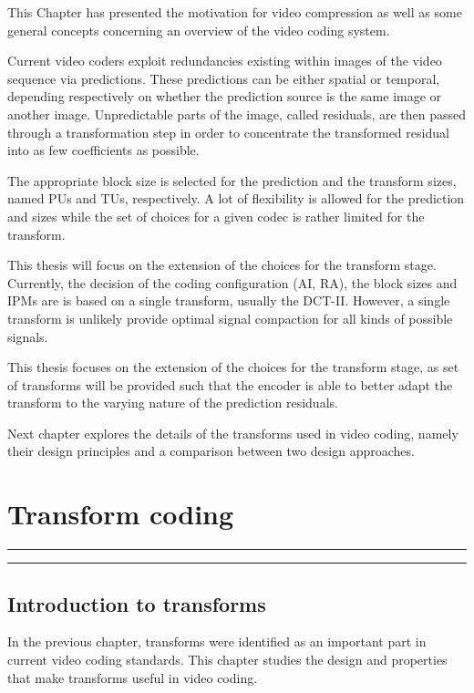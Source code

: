 \documentclass[11pt,a4paper,openright,twoside]{book}
\providecommand{\chaptertoc}{
	\startcontents[chapters]
	\hrule
	\vspace{1em}
	\printcontents[chapters]{}{1}{{\sf\large\bfseries Contents}}
	\vspace{1em}
	\hrule
}
\numberwithin{equation}{section} %
\numberwithin{figure}{section} %
\numberwithin{table}{section} %
\begin{document}
This Chapter has presented the motivation for video compression as well as
some general concepts concerning an overview of the video coding system.

Current video coders exploit redundancies existing within images of the video
sequence via predictions.
These predictions can be either spatial or temporal, depending respectively on
whether the prediction source is the same image or another image.
Unpredictable parts of the image, called residuals, are then passed through a
transformation step in order to concentrate the transformed residual into as
few coefficients as possible.

The appropriate block size is selected for the prediction and the transform
sizes, named \acp{PU} and \acp{TU}, respectively.
A lot of flexibility is allowed for the prediction and sizes while the set of
choices for a given codec is rather limited for the transform.

This thesis will focus on the extension of the choices for the transform
stage.
Currently, the decision of the coding configuration (\ac{AI}, \ac{RA}), the
block sizes and \acp{IPM} are is based on a single transform, usually the
\ac{DCT}-II.
However, a single transform is unlikely provide optimal signal compaction for
all kinds of possible signals.

This thesis focuses on the extension of the choices for the transform
stage, as set of transforms will be provided such that the encoder is able to
better adapt the transform to the varying nature of the prediction residuals.

Next chapter explores the details of the transforms used in video coding,
namely their design principles and a comparison between two design approaches.

\chapter{Transform coding}
\label{cha:transform_coding}
\chaptertoc

\section{Introduction to transforms}
\label{sec:introduction_to_transforms}

In the previous chapter, transforms were identified as an important part in
current video coding standards.
This chapter studies the design and properties that make transforms useful in
video coding.
\end{document}
